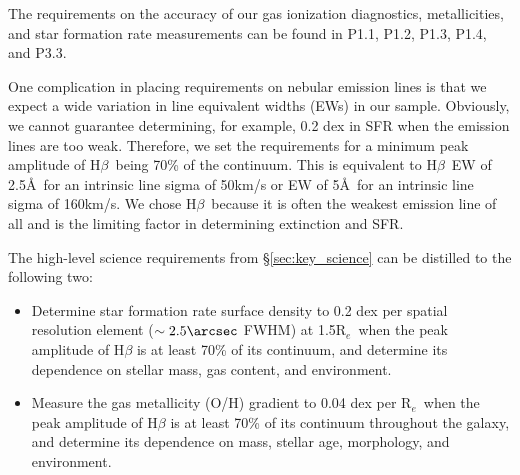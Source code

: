 \documentclass[preprint,11pt]{aastex}
\newcommand{\Hbeta}{{H$\beta$}}
\newcommand{\Reff}{{R$_{e}$}}
\begin{document}
The requirements on the accuracy of our gas ionization diagnostics,
metallicities, and star formation rate measurements can be found in
P1.1, P1.2, P1.3, P1.4, and P3.3.

One complication in placing requirements on nebular emission lines is
that we expect a wide variation in line equivalent widths (EWs) in our
sample. Obviously, we cannot guarantee determining, for example, 0.2
dex in SFR when the emission lines are too weak. Therefore, we set the
requirements for a minimum peak amplitude of \Hbeta\ being 70\% of the
continuum. This is equivalent to \Hbeta\ EW of 2.5\AA\ for an
intrinsic line sigma of 50km/s or EW of 5\AA\ for an intrinsic line
sigma of 160km/s. We chose \Hbeta\ because it is often the weakest
emission line of all and is the limiting factor in determining
extinction and SFR.




The high-level science requirements from \S\ref{sec:key_science} can be distilled to the following two:

\begin{itemize}
\item Determine star formation rate surface density to 0.2 dex per
  spatial resolution element ($\sim2.5\arcsec$ FWHM) at 1.5\Reff\ when
  the peak amplitude of H$\beta$ is at least 70\% of its continuum,
  and determine its dependence on stellar mass, gas content, and
  environment.

\item Measure the gas metallicity (O/H) gradient to 0.04 dex per
  \Reff\ when the peak amplitude of H$\beta$ is at least 70\% of its
  continuum throughout the galaxy, and determine its dependence on
  mass, stellar age, morphology, and environment.
\end{itemize}
\end{document}
